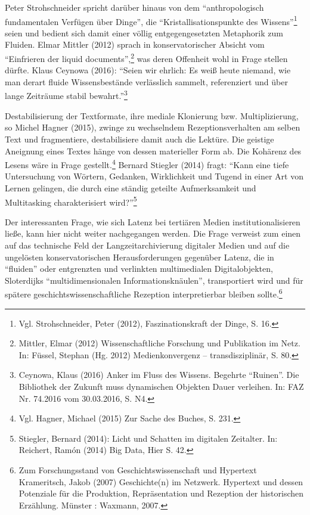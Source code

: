 \documentclass[a4paper,
fontsize=11pt,
oneside,
numbers=noperiodatend,
parskip=half-,
bibliography=totoc,
final
]{scrartcl}
\begin{document}
Peter Strohschneider spricht darüber hinaus von dem
\enquote{anthropologisch fundamentalen Verfügen über Dinge}, die
\enquote{Kristallisationspunkte des Wissens}\footnote{Vgl.
  Strohschneider, Peter (2012), Faszinationskraft der Dinge, S. 16.}
seien und bedient sich damit einer völlig entgegengesetzten Metaphorik
zum Fluiden. Elmar Mittler (2012) sprach in konservatorischer Absicht
vom \enquote{Einfrieren der liquid documents},\footnote{Mittler, Elmar
  (2012) Wissenschaftliche Forschung und Publikation im Netz. In:
  Füssel, Stephan (Hg. 2012) Medienkonvergenz -- transdisziplinär, S.
  80.} was deren Offenheit wohl in Frage stellen dürfte. Klaus Ceynowa
(2016): \enquote{Seien wir ehrlich: Es weiß heute niemand, wie man
derart fluide Wissensbestände verlässlich sammelt, referenziert und über
lange Zeiträume stabil bewahrt.}\footnote{Ceynowa, Klaus (2016) Anker im
  Fluss des Wissens. Begehrte \enquote{Ruinen}. Die Bibliothek der
  Zukunft muss dynamischen Objekten Dauer verleihen. In: FAZ Nr. 74.2016
  vom 30.03.2016, S. N4.}

Destabilisierung der Textformate, ihre mediale Klonierung bzw.
Multiplizierung, so Michel Hagner (2015), zwinge zu wechselndem
Rezeptionsverhalten am selben Text und fragmentiere, destabilisiere
damit auch die Lektüre. Die geistige Aneignung eines Textes hänge von
dessen materieller Form ab. Die Kohärenz des Lesens wäre in Frage
gestellt.\footnote{Vgl. Hagner, Michael (2015) Zur Sache des Buches, S.
  231.} Bernard Stiegler (2014) fragt: \enquote{Kann eine tiefe
Untersuchung von Wörtern, Gedanken, Wirklichkeit und Tugend in einer Art
von Lernen gelingen, die durch eine ständig geteilte Aufmerksamkeit und
Multitasking charakterisiert wird?}\footnote{Stiegler, Bernard (2014):
  Licht und Schatten im digitalen Zeitalter. In: Reichert, Ramón (2014)
  Big Data, Hier S. 42.}

Der interessanten Frage, wie sich Latenz bei tertiären Medien
institutionalisieren ließe, kann hier nicht weiter nachgegangen werden.
Die Frage verweist zum einen auf das technische Feld der
Langzeitarchivierung digitaler Medien und auf die ungelösten
konservatorischen Herausforderungen gegenüber Latenz, die in
\enquote{fluiden} oder entgrenzten und verlinkten multimedialen
Digitalobjekten, Sloterdijks \enquote{multidimensionalen
Informationsknäulen}, transportiert wird und für spätere
geschichtswissenschaftliche Rezeption interpretierbar bleiben
sollte.\footnote{Zum Forschungsstand von Geschichtswissenschaft und
  Hypertext Krameritsch, Jakob (2007) Geschichte(n) im Netzwerk.
  Hypertext und dessen Potenziale für die Produktion, Repräsentation und
  Rezeption der historischen Erzählung. Münster : Waxmann, 2007.}
\end{document}
